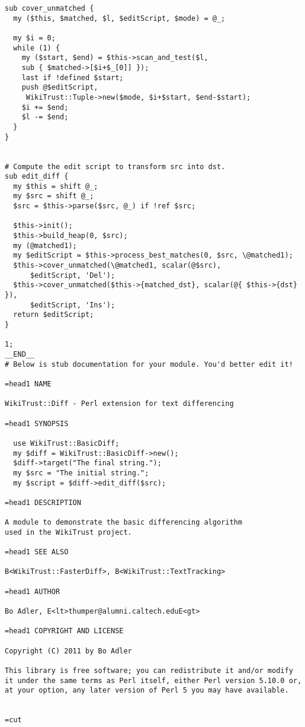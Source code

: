 \begin{lstlisting}
sub cover_unmatched {
  my ($this, $matched, $l, $editScript, $mode) = @_;

  my $i = 0;
  while (1) {
    my ($start, $end) = $this->scan_and_test($l,
	sub { $matched->[$i+$_[0]] });
    last if !defined $start;
    push @$editScript,
	 WikiTrust::Tuple->new($mode, $i+$start, $end-$start);
    $i += $end;
    $l -= $end;
  }
}


# Compute the edit script to transform src into dst.
sub edit_diff {
  my $this = shift @_;
  my $src = shift @_;
  $src = $this->parse($src, @_) if !ref $src;

  $this->init();
  $this->build_heap(0, $src);
  my (@matched1);
  my $editScript = $this->process_best_matches(0, $src, \@matched1);
  $this->cover_unmatched(\@matched1, scalar(@$src),
      $editScript, 'Del');
  $this->cover_unmatched($this->{matched_dst}, scalar(@{ $this->{dst} }),
      $editScript, 'Ins');
  return $editScript;
}

1;
__END__
# Below is stub documentation for your module. You'd better edit it!

=head1 NAME

WikiTrust::Diff - Perl extension for text differencing

=head1 SYNOPSIS

  use WikiTrust::BasicDiff;
  my $diff = WikiTrust::BasicDiff->new();
  $diff->target("The final string.");
  my $src = "The initial string.";
  my $script = $diff->edit_diff($src);

=head1 DESCRIPTION

A module to demonstrate the basic differencing algorithm
used in the WikiTrust project.

=head1 SEE ALSO

B<WikiTrust::FasterDiff>, B<WikiTrust::TextTracking>

=head1 AUTHOR

Bo Adler, E<lt>thumper@alumni.caltech.eduE<gt>

=head1 COPYRIGHT AND LICENSE

Copyright (C) 2011 by Bo Adler

This library is free software; you can redistribute it and/or modify
it under the same terms as Perl itself, either Perl version 5.10.0 or,
at your option, any later version of Perl 5 you may have available.


=cut
\end{lstlisting}
